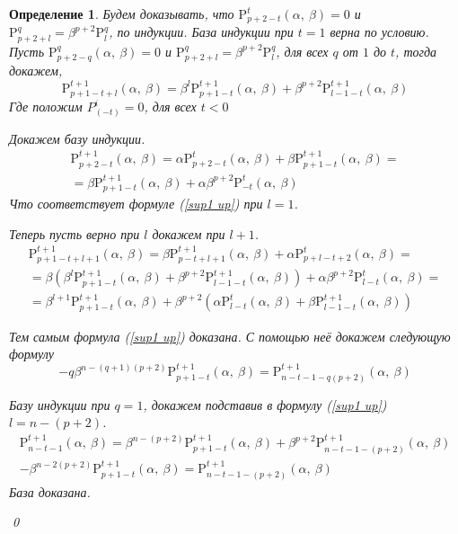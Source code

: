 \documentclass[12pt, reqno, a4paper, oneside, notitlepage]{amsart}
\makeatletter
\theoremstyle{mytheoremstyle}
\theoremstyle{myremarkstyle}
\newtheorem{definition}[theorem]{Определение}
\numberwithin{equation}{section}
\renewenvironment{proof}[1][\proofname]{\par\indent {\bfseries #1\@addpunct{.} }}{\qed}
\makeatother
\begin{document}
\begin{definition}
\begin{proof}
  Будем доказывать, что $\mathrm{P}^t_{p+2-t}(\alpha,\ \beta) = 0$ и 
  $\mathrm{P}^q_{p+2+l} = \beta^{p+2}\mathrm{P}^q_l$, по индукции.
  База индукции при $t=1$ верна по условию.
  Пусть $\mathrm{P}^q_{p+2-q}(\alpha,\ \beta) = 0$ и 
  $\mathrm{P}^q_{p+2+l} = \beta^{p+2}\mathrm{P}^q_l$, для всех $q$ от $1$ до $t$,
  тогда докажем, 
  \begin{equation}\label{sup1 up}
	\mathrm{P}^{t+1}_{p+1-t+l}(\alpha,\ \beta) = 
	  \beta^l\mathrm{P}^{t+1}_{p+1-t}(\alpha,\ \beta) + 
	  \beta^{p+2}\mathrm{P}^{t+1}_{l-1-t}(\alpha,\ \beta)
  \end{equation}
  Где положим $P^i_{(-t)} = 0$, для всех $t < 0$

  Докажем базу индукции.
  \begin{eqnarray*}
	\mathrm{P}^{t+1}_{p+2-t}(\alpha,\ \beta) =
	\alpha\mathrm{P}^t_{p+2-t}(\alpha,\ \beta) +
	\beta\mathrm{P}^{t+1}_{p+1-t}(\alpha,\ \beta) =\\
	= \beta\mathrm{P}^{t+1}_{p+1-t}(\alpha,\ \beta) +
	\alpha\beta^{p+2}\mathrm{P}^t_{-t}(\alpha,\ \beta)
  \end{eqnarray*}
  Что соответствует формуле (\ref{sup1 up}) при $l=1$.

  Теперь пусть верно при $l$ докажем при $l+1$.
  \begin{eqnarray*}
  \mathrm{P}^{t+1}_{p+1-t+l+1}(\alpha,\ \beta) = 
	\beta\mathrm{P}^{t+1}_{p-t+l+1}(\alpha,\ \beta) + 
	\alpha\mathrm{P}^t_{p+l-t+2}(\alpha,\ \beta) = \\
	 = \beta\left(\beta^l\mathrm{P}^{t+1}_{p+1-t}(\alpha,\ \beta) + 
	\beta^{p+2}\mathrm{P}^{t+1}_{l-1-t}(\alpha,\ \beta)\right) +
	\alpha\beta^{p+2}\mathrm{P}^t_{l-t}(\alpha,\ \beta) =\\
	= \beta^{l+1}\mathrm{P}^{t+1}_{p+1-t}(\alpha,\ \beta) + 
	\beta^{p+2}(\alpha\mathrm{P}^t_{l-t}(\alpha,\ \beta) + 
	\beta\mathrm{P}^{t+1}_{l-1-t}(\alpha,\ \beta))
  \end{eqnarray*}

  Тем самым формула (\ref{sup1 up}) доказана.
  С помощью неё докажем следующую формулу 
  \begin{equation}\label{sup2 up}
	-q\beta^{n-(q+1)(p+2)}\mathrm{P}^{t+1}_{p+1-t}(\alpha,\ \beta) = 
	\mathrm{P}^{t+1}_{n-t-1-q(p+2)}(\alpha,\ \beta)
  \end{equation}

  Базу индукции при $q = 1$, докажем подставив в формулу (\ref{sup1 up})
  $l = n - (p+2)$.
  \begin{eqnarray*}
	\mathrm{P}^{t+1}_{n-t-1}(\alpha,\ \beta)= 
	\beta^{n-(p+2)}\mathrm{P}^{t+1}_{p+1-t}(\alpha,\ \beta) + 
	\beta^{p+2} \mathrm{P}^{t+1}_{n-t-1-(p+2)}(\alpha,\ \beta)\\
	-\beta^{n-2(p+2)}\mathrm{P}^{t+1}_{p+1-t}(\alpha,\ \beta) =
	\mathrm{P}^{t+1}_{n-t-1-(p+2)}(\alpha,\ \beta)
  \end{eqnarray*}
  База доказана.


\end{proof}
\end{definition}
\end{document}
